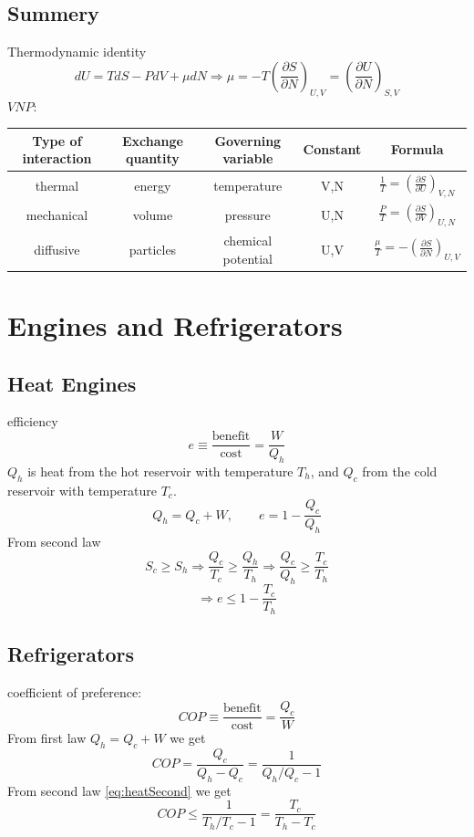 \documentclass[a4paper,norsk, 10pt]{article}
\newcommand{\pd}[3]{\left(\frac{\partial #1}{\partial #2}\right)_{#3}}
\begin{document}
\subsection{Summery}
Thermodynamic identity
\begin{equation}
dU = TdS - PdV + \mu dN \Rightarrow \mu = -T\pd{S}{N}{U,V} = \pd{U}{N}{S,V}
\end{equation}
$VNP:$
\begin{table}[H]
\centering
\begin{tabular}{c c c c c}
Type of interaction & Exchange quantity & Governing variable & Constant & Formula\\
\hline
thermal & energy & temperature & V,N & $\frac{1}{T} = \left(\frac{\partial S}{\partial U}\right)_{V,N}$\\
mechanical & volume & pressure & U,N & $\frac{P}{T} = \left(\frac{\partial S}{\partial V}\right)_{U,N}$\\
diffusive & particles & chemical potential & U,V & $\frac{\mu}{T} = -\left(\frac{\partial S}{\partial N}\right)_{U,V}$
\end{tabular}
\end{table}
\section{Engines and Refrigerators}
\subsection{Heat Engines}
efficiency
\begin{equation}
e \equiv \frac{\text{benefit}}{\text{cost}} = \frac{W}{Q_h}
\end{equation}
$Q_h$ is heat from the hot reservoir with temperature $T_h$, and $Q_c$ from the cold reservoir with temperature $T_c$.
\begin{equation}
Q_h = Q_c + W, \qquad e = 1 - \frac{Q_c}{Q_h}
\end{equation}
From second law
\begin{equation}
S_c \geq S_h \Rightarrow \frac{Q_c}{T_c} \geq \frac{Q_h}{T_h} \Rightarrow \frac{Q_c}{Q_h} \geq \frac{T_c}{T_h}
\label{eq:heatSecond}
\end{equation}
\begin{equation}
 \Rightarrow e \leq 1 - \frac{T_c}{T_h}
\end{equation}
\subsection{Refrigerators}
coefficient of preference:
\begin{equation}
COP \equiv \frac{\text{benefit}}{\text{cost}} = \frac{Q_c}{W}
\end{equation}
From first law $Q_h = Q_c + W$ we get
\begin{equation}
COP = \frac{Q_c}{Q_h - Q_c} = \frac{1}{Q_h/Q_c - 1}
\end{equation}
From second law \eqref{eq:heatSecond} we get
\begin{equation}
COP \leq \frac{1}{T_h/T_c - 1} = \frac{T_c}{T_h - T_c}
\end{equation}
\end{document}
